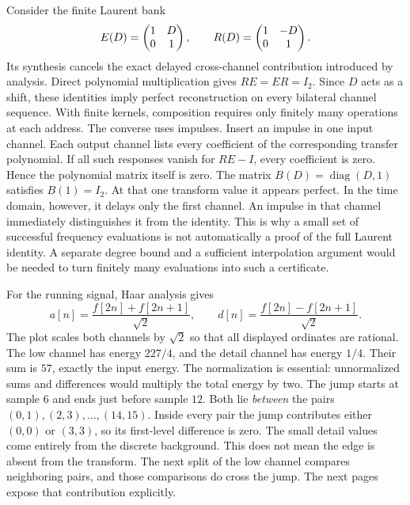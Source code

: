 Consider the finite Laurent bank
\[
E(D)=\begin{pmatrix}1&D\\0&1\end{pmatrix},\qquad
R(D)=\begin{pmatrix}1&-D\\0&1\end{pmatrix}.
\]
Its synthesis cancels the exact delayed cross-channel contribution introduced by analysis.
Direct polynomial multiplication gives $RE=ER=I_2$. Since $D$ acts as a shift, these identities imply perfect reconstruction on every bilateral channel sequence. With finite kernels, composition requires only finitely many operations at each address.
The converse uses impulses. Insert an impulse in one input channel. Each output channel lists every coefficient of the corresponding transfer polynomial. If all such responses vanish for $RE-I$, every coefficient is zero. Hence the polynomial matrix itself is zero.
The matrix $B(D)=\operatorname{diag}(D,1)$ satisfies $B(1)=I_2$. At that one transform value it appears perfect. In the time domain, however, it delays only the first channel. An impulse in that channel immediately distinguishes it from the identity.
This is why a small set of successful frequency evaluations is not automatically a proof of the full Laurent identity. A separate degree bound and a sufficient interpolation argument would be needed to turn finitely many evaluations into such a certificate.

For the running signal, Haar analysis gives
\[
a[n]=\frac{f[2n]+f[2n+1]}{\sqrt2},\qquad
d[n]=\frac{f[2n]-f[2n+1]}{\sqrt2}.
\]
The plot scales both channels by $\sqrt2$ so that all displayed ordinates are rational.
The low channel has energy $227/4$, and the detail channel has energy $1/4$. Their sum is $57$, exactly the input energy. The normalization is essential: unnormalized sums and differences would multiply the total energy by two.
The jump starts at sample $6$ and ends just before sample $12$. Both lie \emph{between} the pairs $(0,1),(2,3),\ldots,(14,15)$. Inside every pair the jump contributes either $(0,0)$ or $(3,3)$, so its first-level difference is zero. The small detail values come entirely from the discrete background.
This does not mean the edge is absent from the transform. The next split of the low channel compares neighboring pairs, and those comparisons do cross the jump. The next pages expose that contribution explicitly.

